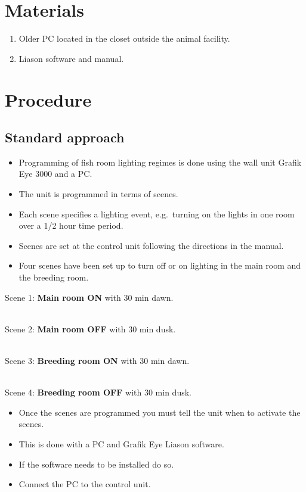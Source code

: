 \documentclass[
  letterpaper,
  DIV=11,
  numbers=noendperiod]{scrreprt}
\providecommand{\tightlist}{%
  \setlength{\itemsep}{0pt}\setlength{\parskip}{0pt}}\usepackage{longtable,booktabs,array}
\begin{document}
\hypertarget{materials-41}{%
\section{Materials}\label{materials-41}}

\begin{enumerate}
\def\labelenumi{\arabic{enumi}.}
\setcounter{enumi}{1}
\tightlist
\item
  Older PC located in the closet outside the animal facility.
\item
  Liason software and manual.
\end{enumerate}

\hypertarget{procedure-42}{%
\section{Procedure}\label{procedure-42}}

\hypertarget{standard-approach}{%
\subsection{Standard approach}\label{standard-approach}}

\begin{itemize}
\tightlist
\item
  Programming of fish room lighting regimes is done using the wall unit
  Grafik Eye 3000 and a PC.
\item
  The unit is programmed in terms of scenes.
\item
  Each scene specifies a lighting event, e.g.~turning on the lights in
  one room over a 1/2 hour time period.
\item
  Scenes are set at the control unit following the directions in the
  manual.
\item
  Four scenes have been set up to turn off or on lighting in the main
  room and the breeding room.
\end{itemize}

Scene 1: \textbf{Main room ON} with 30 min dawn.\\
\strut \\
Scene 2: \textbf{Main room OFF} with 30 min dusk.\\
\strut \\
Scene 3: \textbf{Breeding room ON} with 30 min dawn.\\
\strut \\
Scene 4: \textbf{Breeding room OFF} with 30 min dusk.

\begin{itemize}
\tightlist
\item
  Once the scenes are programmed you must tell the unit when to activate
  the scenes.
\item
  This is done with a PC and Grafik Eye Liason software.
\item
  If the software needs to be installed do so.
\item
  Connect the PC to the control unit.
\end{itemize}
\end{document}
